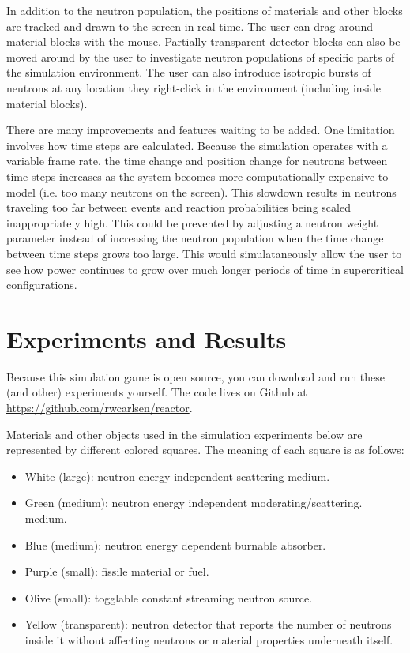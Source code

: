 \documentclass{anstrans}
\begin{document}
In addition to the neutron population, the positions of materials and other
blocks are tracked and drawn to the screen in real-time.  The user can drag
around material blocks with the mouse.  Partially transparent detector blocks
can also be moved around by the user to investigate neutron populations of
specific parts of the simulation environment.  The user can also introduce
isotropic bursts of neutrons at any location they right-click in the
environment (including inside material blocks).

There are many improvements and features waiting to be added.  One limitation
involves how time steps are calculated.  Because the simulation operates with
a variable frame rate, the time change and position change for neutrons
between time steps increases as the system becomes more computationally
expensive to model (i.e. too many neutrons on the screen).  This slowdown
results in neutrons traveling too far between events and reaction
probabilities being scaled inappropriately high.  This could be prevented by
adjusting a neutron weight parameter instead of increasing the neutron
population when the time change between time steps grows too large.  This
would simulataneously allow the user to see how power continues to grow over
much longer periods of time in supercritical configurations.  

\section{Experiments and Results}

Because this simulation game is open source, you can download and run these
(and other) experiments yourself.  The code lives on Github at
\url{https://github.com/rwcarlsen/reactor}.

Materials and other objects used in the simulation experiments below are
represented by different colored squares.  The meaning of each square is as
follows:

\begin{itemize}
        
    \item White (large): neutron energy independent scattering medium.

    \item Green (medium): neutron energy independent moderating/scattering.
        medium.

    \item Blue (medium): neutron energy dependent burnable absorber.

    \item Purple (small): fissile material or fuel.

    \item Olive (small): togglable constant streaming neutron source.

    \item Yellow (transparent): neutron detector that reports the number of
        neutrons inside it without affecting neutrons or material properties
        underneath itself.

\end{itemize}
\end{document}
